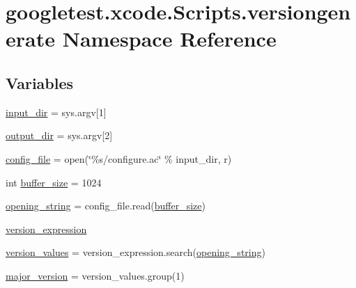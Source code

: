 \hypertarget{namespacegoogletest_1_1xcode_1_1_scripts_1_1versiongenerate}{}\section{googletest.\+xcode.\+Scripts.\+versiongenerate Namespace Reference}
\label{namespacegoogletest_1_1xcode_1_1_scripts_1_1versiongenerate}
\subsection*{Variables}
\begin{DoxyCompactItemize}
\item 
\mbox{\hyperlink{namespacegoogletest_1_1xcode_1_1_scripts_1_1versiongenerate_a3748e6ed5fa3fe01c597805ad37d9600}{input\+\_\+dir}} = sys.\+argv\mbox{[}1\mbox{]}
\item 
\mbox{\hyperlink{namespacegoogletest_1_1xcode_1_1_scripts_1_1versiongenerate_a138e5c4be443480d16c8b2f974deec78}{output\+\_\+dir}} = sys.\+argv\mbox{[}2\mbox{]}
\item 
\mbox{\hyperlink{namespacegoogletest_1_1xcode_1_1_scripts_1_1versiongenerate_ac4026359183baf7e80f13e280faf2e21}{config\+\_\+file}} = open(\char`\"{}\%s/configure.\+ac\char`\"{} \% input\+\_\+dir, \textquotesingle{}r\textquotesingle{})
\item 
int \mbox{\hyperlink{namespacegoogletest_1_1xcode_1_1_scripts_1_1versiongenerate_a940807ec879f248f6ae06617bd4e24ac}{buffer\+\_\+size}} = 1024
\item 
\mbox{\hyperlink{namespacegoogletest_1_1xcode_1_1_scripts_1_1versiongenerate_a3428413265d3871efc361a80baf20932}{opening\+\_\+string}} = config\+\_\+file.\+read(\mbox{\hyperlink{namespacegoogletest_1_1xcode_1_1_scripts_1_1versiongenerate_a940807ec879f248f6ae06617bd4e24ac}{buffer\+\_\+size}})
\item 
\mbox{\hyperlink{namespacegoogletest_1_1xcode_1_1_scripts_1_1versiongenerate_a8c376adfce601225015c8aef7d35fb9e}{version\+\_\+expression}}
\item 
\mbox{\hyperlink{namespacegoogletest_1_1xcode_1_1_scripts_1_1versiongenerate_ad500e7c3500c15a782efcdfafd3d6d01}{version\+\_\+values}} = version\+\_\+expression.\+search(\mbox{\hyperlink{namespacegoogletest_1_1xcode_1_1_scripts_1_1versiongenerate_a3428413265d3871efc361a80baf20932}{opening\+\_\+string}})
\item 
\mbox{\hyperlink{namespacegoogletest_1_1xcode_1_1_scripts_1_1versiongenerate_a8a81689c7b037837d4960a3a4c89c227}{major\+\_\+version}} = version\+\_\+values.\+group(1)

\end{DoxyCompactItemize}
